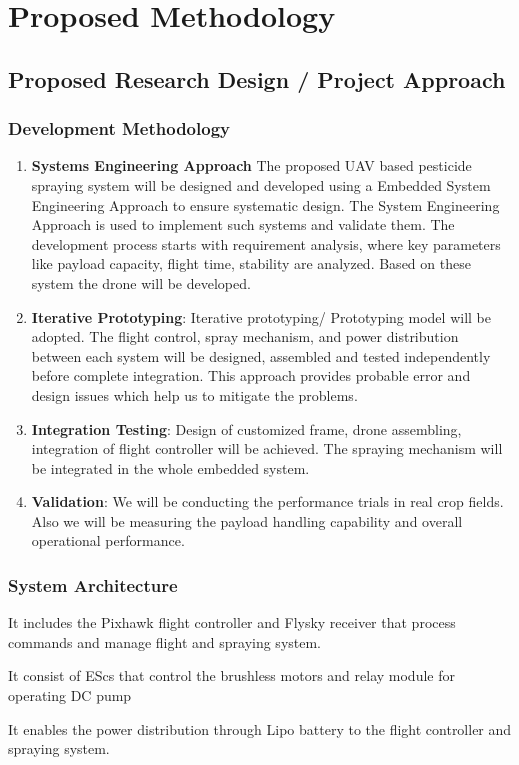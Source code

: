 \setcounter{chapter}{2}
\chapter{Proposed Methodology}

\section{Proposed Research Design / Project Approach}

\subsection{Development Methodology}
\begin{enumerate}[label=\roman*.]
  \item \textbf{Systems Engineering Approach}
  The proposed UAV based pesticide spraying system will be designed and developed using a Embedded System Engineering Approach to ensure systematic design. The System Engineering Approach is used to implement such systems and validate them. The development process starts with requirement analysis, where key parameters like payload capacity, flight time, stability are analyzed. Based on these system the drone will be developed. 
  \item \textbf{Iterative Prototyping}: Iterative prototyping/ Prototyping model will be adopted. The flight control, spray mechanism, and power distribution between each system will be designed, assembled and tested independently before complete integration. This approach provides probable error and design issues which help us to mitigate the problems.
  \item \textbf{Integration Testing}: Design of customized frame, drone assembling, integration of flight controller will be achieved. The spraying mechanism will be integrated in the whole embedded system.
  \item \textbf{Validation}: We will be conducting the performance trials in real crop fields. Also we will be measuring the payload handling capability and overall operational performance.
\end{enumerate}

\subsection{System Architecture}
\begin{description}[style=nextline]
  \item[Flight Control Layer:] It includes the Pixhawk flight controller and Flysky receiver that process commands and manage flight and spraying system. 
  \item[Actuation Layer:] It consist of EScs that control the brushless motors and relay module for operating DC pump
  \item[Power Distribution Layer:] It enables the power distribution through Lipo battery to the flight controller and spraying system.
\end{description}

